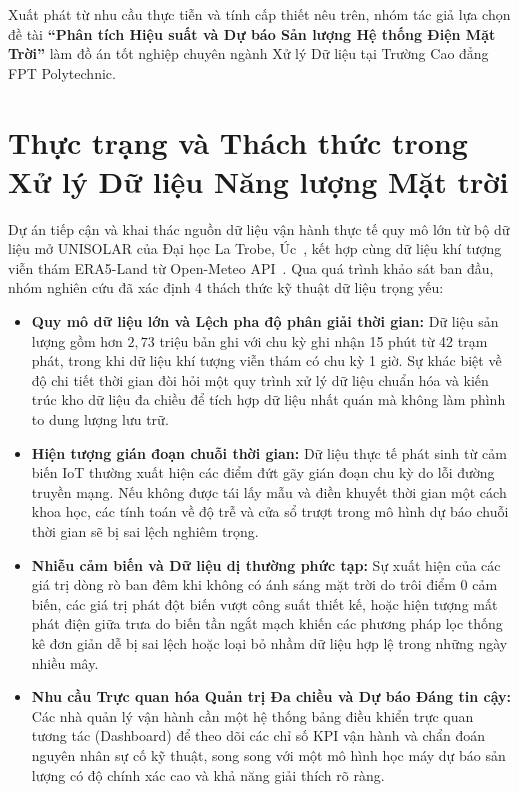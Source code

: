 \documentclass[12pt, a4paper]{report}
\begin{document}
Xuất phát từ nhu cầu thực tiễn và tính cấp thiết nêu trên, nhóm tác giả lựa chọn đề tài \textbf{``Phân tích Hiệu suất và Dự báo Sản lượng Hệ thống Điện Mặt Trời''} làm đồ án tốt nghiệp chuyên ngành Xử lý Dữ liệu tại Trường Cao đẳng FPT Polytechnic.

\section{Thực trạng và Thách thức trong Xử lý Dữ liệu Năng lượng Mặt trời}
\label{sec:thuctrang_thachthuc}

Dự án tiếp cận và khai thác nguồn dữ liệu vận hành thực tế quy mô lớn từ bộ dữ liệu mở UNISOLAR của Đại học La Trobe, Úc~\cite{wimalaratne2022unisolar}, kết hợp cùng dữ liệu khí tượng viễn thám ERA5-Land từ Open-Meteo API~\cite{openmeteo2023}. Qua quá trình khảo sát ban đầu, nhóm nghiên cứu đã xác định 4 thách thức kỹ thuật dữ liệu trọng yếu:

\begin{itemize}[noitemsep]
    \item \textbf{Quy mô dữ liệu lớn và Lệch pha độ phân giải thời gian:} Dữ liệu sản lượng gồm hơn $2{,}73$ triệu bản ghi với chu kỳ ghi nhận 15 phút từ 42 trạm phát, trong khi dữ liệu khí tượng viễn thám có chu kỳ 1 giờ. Sự khác biệt về độ chi tiết thời gian đòi hỏi một quy trình xử lý dữ liệu chuẩn hóa và kiến trúc kho dữ liệu đa chiều để tích hợp dữ liệu nhất quán mà không làm phình to dung lượng lưu trữ.
    \item \textbf{Hiện tượng gián đoạn chuỗi thời gian:} Dữ liệu thực tế phát sinh từ cảm biến IoT thường xuất hiện các điểm đứt gãy gián đoạn chu kỳ do lỗi đường truyền mạng. Nếu không được tái lấy mẫu và điền khuyết thời gian một cách khoa học, các tính toán về độ trễ và cửa sổ trượt trong mô hình dự báo chuỗi thời gian sẽ bị sai lệch nghiêm trọng.
    \item \textbf{Nhiễu cảm biến và Dữ liệu dị thường phức tạp:} Sự xuất hiện của các giá trị dòng rò ban đêm khi không có ánh sáng mặt trời do trôi điểm 0 cảm biến, các giá trị phát đột biến vượt công suất thiết kế, hoặc hiện tượng mất phát điện giữa trưa do biến tần ngắt mạch khiến các phương pháp lọc thống kê đơn giản dễ bị sai lệch hoặc loại bỏ nhầm dữ liệu hợp lệ trong những ngày nhiều mây.
    \item \textbf{Nhu cầu Trực quan hóa Quản trị Đa chiều và Dự báo Đáng tin cậy:} Các nhà quản lý vận hành cần một hệ thống bảng điều khiển trực quan tương tác (Dashboard) để theo dõi các chỉ số KPI vận hành và chẩn đoán nguyên nhân sự cố kỹ thuật, song song với một mô hình học máy dự báo sản lượng có độ chính xác cao và khả năng giải thích rõ ràng.
\end{itemize}
\end{document}
